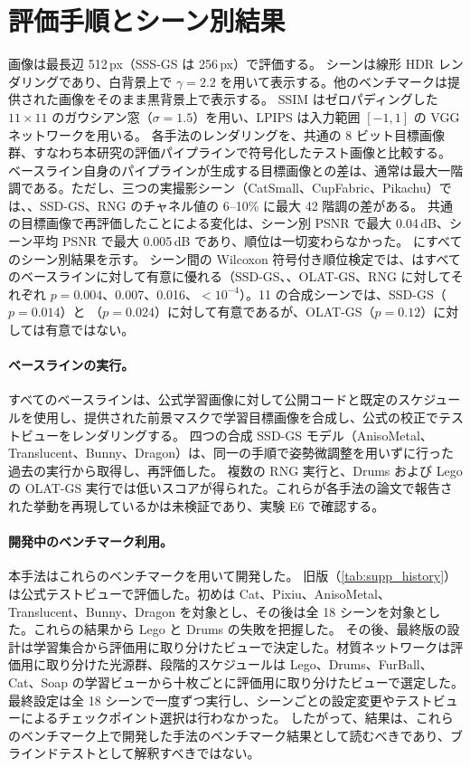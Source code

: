 \documentclass[10pt,twocolumn,letterpaper]{article}
\begin{document}
\section{評価手順とシーン別結果}
\label{sec:s_eval}
画像は最長辺 512\,px（SSS-GS は 256\,px）で評価する。
\gsthree シーンは線形 HDR レンダリングであり、白背景上で $\gamma=2.2$ を用いて表示する。他のベンチマークは提供された画像をそのまま黒背景上で表示する。
SSIM はゼロパディングした $11\times11$ のガウシアン窓（$\sigma=1.5$）を用い、LPIPS は入力範囲 $[-1,1]$ の VGG ネットワークを用いる。
各手法のレンダリングを、共通の 8 ビット目標画像群、すなわち本研究の評価パイプラインで符号化したテスト画像と比較する。
ベースライン自身のパイプラインが生成する目標画像との差は、通常は最大一階調である。ただし、三つの実撮影シーン（CatSmall、CupFabric、Pikachu）では、\gsthree、SSD-GS、RNG のチャネル値の 6--10\% に最大 42 階調の差がある。
共通の目標画像で再評価したことによる変化は、シーン別 PSNR で最大 0.04\,dB、シーン平均 PSNR で最大 0.005\,dB であり、順位は一切変わらなかった。
 にすべてのシーン別結果を示す。
シーン間の Wilcoxon 符号付き順位検定では、\ours はすべてのベースラインに対して有意に優れる（SSD-GS、\gsthree、OLAT-GS、RNG に対してそれぞれ $p=0.004$、0.007、0.016、$<10^{-4}$）。11 の合成シーンでは、SSD-GS（$p=0.014$）と \gsthree（$p=0.024$）に対して有意であるが、OLAT-GS（$p=0.12$）に対しては有意ではない。

\paragraph{ベースラインの実行。}
すべてのベースラインは、公式学習画像に対して公開コードと既定のスケジュールを使用し、提供された前景マスクで学習目標画像を合成し、公式の校正でテストビューをレンダリングする。
四つの合成 SSD-GS モデル（AnisoMetal、Translucent、Bunny、Dragon）は、同一の手順で姿勢微調整を用いずに行った過去の実行から取得し、再評価した。
複数の RNG 実行と、Drums および Lego の OLAT-GS 実行では低いスコアが得られた。これらが各手法の論文で報告された挙動を再現しているかは未検証であり、実験 E6 で確認する。

\paragraph{開発中のベンチマーク利用。}
本手法はこれらのベンチマークを用いて開発した。
旧版（\cref{tab:supp_history}）は公式テストビューで評価した。初めは Cat、Pixiu、AnisoMetal、Translucent、Bunny、Dragon を対象とし、その後は全 18 シーンを対象とした。これらの結果から Lego と Drums の失敗を把握した。
その後、最終版の設計は学習集合から評価用に取り分けたビューで決定した。材質ネットワークは評価用に取り分けた光源群、段階的スケジュールは Lego、Drums、FurBall、Cat、Soap の学習ビューから十枚ごとに評価用に取り分けたビューで選定した。
最終設定は全 18 シーンで一度ずつ実行し、シーンごとの設定変更やテストビューによるチェックポイント選択は行わなかった。
したがって、結果は、これらのベンチマーク上で開発した手法のベンチマーク結果として読むべきであり、ブラインドテストとして解釈すべきではない。
\end{document}
